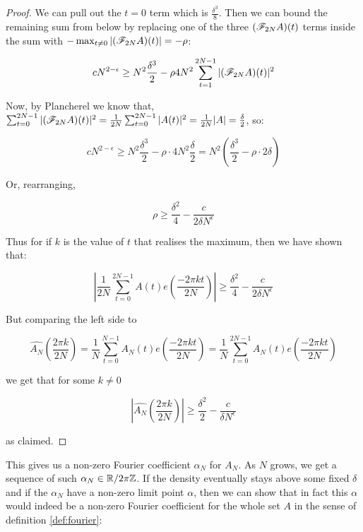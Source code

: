 \documentclass{report}
\newtheorem{corollary}{Corollary}[theorem]
\theoremstyle{remark}
\numberwithin{equation}{section}
\begin{document}
\begin{proof}
  We can pull out the $t = 0$ term which is $\frac{\delta^3}{8}$.  Then we can
  bound the remaining sum from below by replacing one of the three
  $(\mathscr{F}_{2N} A)(t)$ terms inside the sum with
  $-\max_{t\neq 0} |(\mathscr{F}_{2N} A)(t)| = -\rho$:
  
  \[cN^{2-\epsilon} \geq N^2 \frac{\delta^3}{2} - \rho 4 N^2 \sum_{t=1}^{2N-1} |(\mathscr{F}_{2N} A)(t)|^2\]

  Now, by Plancherel we know that,
  $\sum_{t=0}^{2N-1} |(\mathscr{F}_{2N}A)(t)|^2 = \frac{1}{2N}
  \sum_{t=0}^{2N-1} |A(t)|^2 = \frac{1}{2N} |A| = \frac{\delta}{2}$,
  so:

  \[cN^{2-\epsilon} \geq N^2 \frac{\delta^3}{2} - \rho \cdot 4N^2
    \frac{\delta}{2} = N^2\left(\frac{\delta^3}{2} - \rho\cdot 2
      \delta \right)\]

  Or, rearranging, 

  \[\rho \geq \frac{\delta^2}{4} - \frac{c}{2\delta N^\epsilon}\]

  Thus for if $k$ is the value of $t$ that realises the maximum, then we
  have shown that: 
  
  \[\left|\frac{1}{2N} \sum_{t=0}^{2N-1} A(t) e(\frac{-2\pi k
        t}{2N})\right| \geq \frac{\delta^2}{4} - \frac{c}{2\delta N^\epsilon}\]
  
  But comparing the left side to 
  
  \[\widehat{A_N}(\frac{2\pi k}{2N}) = \frac{1}{N}\sum_{t=0}^{N-1} A_N(t) e(\frac{-2\pi k
      t}{2N}) = \frac{1}{N}\sum_{t=0}^{2N-1} A_N(t) e(\frac{-2\pi k
      t}{2N})\]
  
  we get that for some $k \neq 0$

  \[|\widehat{A_N}(\frac{2\pi k}{2N})| \geq \frac{\delta^2}{2} - \frac{c}{\delta
      N^\epsilon}\]

  as claimed.
\end{proof}

This gives us a non-zero Fourier coefficient $\alpha_N$ for $A_N$.  As
$N$ grows, we get a sequence of such $\alpha_N \in \mathbb{R}/2\pi\mathbb{Z}$.  If the
density eventually stays above some fixed $\delta$ and if the
$\alpha_N$ have a non-zero limit point $\alpha$, then we can show that
in fact this $\alpha$ would indeed be a non-zero Fourier coefficient
for the whole set $A$ in the sense of definition \ref{def:fourier}: 

\end{document}
